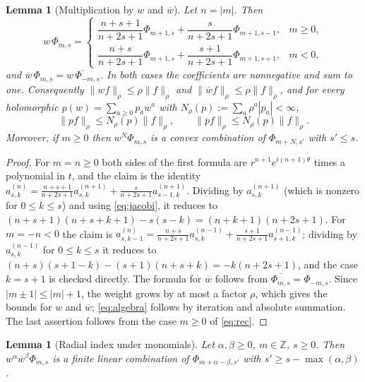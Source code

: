 \documentclass[11pt]{amsart}
\newtheorem{lemma}[theorem]{Lemma}
\theoremstyle{definition}
\theoremstyle{remark}
\numberwithin{equation}{section}
\newcommand{\Z}{\mathbb{Z}}
\newcommand{\bw}{\overline{w}}
\newcommand{\nrm}[1]{\lVert #1\rVert}
\begin{document}
\begin{lemma}[Multiplication by $w$ and $\bw$]\label{lem:mult}
Let $n=|m|$. Then
\begin{equation}\label{eq:rec}
w\,\Phi_{m,s}=
\begin{cases}
\dfrac{n+s+1}{n+2s+1}\Phi_{m+1,s}+\dfrac{s}{n+2s+1}\Phi_{m+1,s-1}, & m\geq0,\\[8pt]
\dfrac{n+s}{n+2s+1}\Phi_{m+1,s}+\dfrac{s+1}{n+2s+1}\Phi_{m+1,s+1}, & m<0,
\end{cases}
\end{equation}
and $\bw\,\Phi_{m,s}=\overline{w\,\Phi_{-m,s}}$. In both cases the coefficients are nonnegative and sum to one. Consequently $\nrm{wf}_\rho\leq\rho\nrm f_\rho$ and $\nrm{\bw f}_\rho\leq\rho\nrm f_\rho$, and for every holomorphic $p(w)=\sum_{a\geq0}p_aw^a$ with $N_\rho(p):=\sum_a\rho^a|p_a|<\infty$,
\begin{equation}\label{eq:algebra}
\nrm{pf}_\rho\leq N_\rho(p)\nrm f_\rho,\qquad \nrm{\overline pf}_\rho\leq N_\rho(p)\nrm f_\rho .
\end{equation}
Moreover, if $m\geq0$ then $w^N\Phi_{m,s}$ is a convex combination of $\Phi_{m+N,s'}$ with $s'\leq s$.
\end{lemma}

\begin{proof}
For $m=n\geq0$ both sides of the first formula are $r^{n+1}e^{i(n+1)\theta}$ times a polynomial in $t$, and the claim is the identity $a^{(n)}_{s,k}=\frac{n+s+1}{n+2s+1}a^{(n+1)}_{s,k}+\frac{s}{n+2s+1}a^{(n+1)}_{s-1,k}$. Dividing by $a^{(n+1)}_{s,k}$ (which is nonzero for $0\leq k\leq s$) and using \eqref{eq:jacobi}, it reduces to $(n+s+1)(n+s+k+1)-s(s-k)=(n+k+1)(n+2s+1)$. For $m=-n<0$ the claim is $a^{(n)}_{s,k-1}=\frac{n+s}{n+2s+1}a^{(n-1)}_{s,k}+\frac{s+1}{n+2s+1}a^{(n-1)}_{s+1,k}$; dividing by $a^{(n-1)}_{s,k}$ for $0\leq k\leq s$ it reduces to $(n+s)(s+1-k)-(s+1)(n+s+k)=-k(n+2s+1)$, and the case $k=s+1$ is checked directly. The formula for $\bw$ follows from $\overline{\Phi_{m,s}}=\Phi_{-m,s}$. Since $|m\pm1|\leq|m|+1$, the weight grows by at most a factor $\rho$, which gives the bounds for $w$ and $\bw$; \eqref{eq:algebra} follows by iteration and absolute summation. The last assertion follows from the case $m\geq0$ of \eqref{eq:rec}.
\end{proof}

\begin{lemma}[Radial index under monomials]\label{lem:radial}
Let $\alpha,\beta\geq0$, $m\in\Z$, $s\geq0$. Then $w^\alpha\bw^\beta\Phi_{m,s}$ is a finite linear combination of $\Phi_{m+\alpha-\beta,s'}$ with $s'\geq s-\max(\alpha,\beta)$.
\end{lemma}
\end{document}
